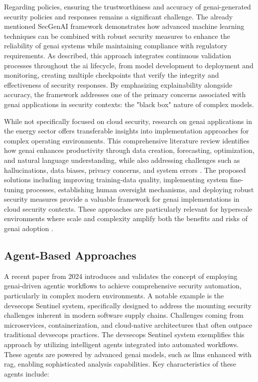 Regarding policies, ensuring the trustworthiness and accuracy of \gls{genai}-generated security policies and responses remains a significant challenge. The already mentioned SecGenAI framework demonstrates how advanced machine learning techniques can be combined with robust security measures to enhance the reliability of \gls{genai} systems while maintaining compliance with regulatory requirements.\cite{haryanto_secgenai_2024}
As described, this approach integrates continuous validation processes throughout the \gls{ai} lifecycle, from model development to deployment and monitoring, creating multiple checkpoints that verify the integrity and effectiveness of security responses. By emphasizing explainability alongside accuracy, the framework addresses one of the primary concerns associated with \gls{genai} applications in security contexts: the "black box" nature of complex models.\cite{haryanto_secgenai_2024}

While not specifically focused on cloud security, research on \gls{genai} applications in the energy sector offers transferable insights into implementation approaches for complex operating environments. This comprehensive literature review identifies how \gls{genai} enhances productivity through data creation, forecasting, optimization, and natural language understanding, while also addressing challenges such as hallucinations, data biases, privacy concerns, and system errors \cite{surathunmanun_exploring_2024}. The proposed solutions including improving \gls{training-data} quality, implementing system fine-tuning processes, establishing human oversight mechanisms, and deploying robust security measures provide a valuable framework for \gls{genai} implementations in cloud security contexts. These approaches are particularly relevant for \gls{hyperscale} environments where scale and complexity amplify both the benefits and risks of \gls{genai} adoption \cite{surathunmanun_exploring_2024}.

\subsection{Agent-Based Approaches} %
\label{sec:Agent-Based Approaches}

A recent paper from 2024 introduces and validates the concept of employing \gls{genai}-driven agentic workflows to achieve comprehensive security automation, particularly in complex modern environments. A notable example is the \gls{devsecops} Sentinel system\cite{pillala_devsecops_2024}, specifically designed to address the mounting security challenges inherent in modern software supply chains. Challenges coming from \gls{microservices}, \gls{containerization}, and \gls{cloud-native} architectures that often outpace traditional \gls{devsecops} practices\cite{pillala_devsecops_2024}.
The \gls{devsecops} Sentinel system exemplifies this approach by utilizing intelligent agents integrated into automated workflows. These agents are powered by advanced \gls{genai} models, such as \glspl{llm} enhanced with \gls{rag}, enabling sophisticated analysis capabilities\cite{pillala_devsecops_2024}. Key characteristics of these agents include:

